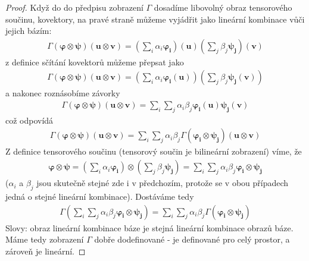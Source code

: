 \documentclass[a5paper,12pt]{amsbook}
\theoremstyle{definition}
\newcommand{\myvec}[1]{\mathbf{#1}}
\begin{document}
\begin{proof}
Když do do předpisu zobrazení $\Gamma$ dosadíme libovolný obraz tensorového součinu, kovektory,
na pravé straně můžeme vyjádřit jako lineární kombinace vůči jejich bázím:
\begin{equation*}
\begin{split}
\Gamma(\myvec{\varphi}\otimes\myvec{\psi})(\myvec{u}\otimes\myvec{v}) =
  \left(\sum_{i}\alpha_i\myvec{\varphi_i}\right)(\myvec{u})
  \left(\sum_{j}\beta_j\myvec{\psi_j}\right)(\myvec{v})
\end{split}
\end{equation*}
z definice sčítání kovektorů můžeme přepsat jako
\begin{equation*}
\begin{split}
\Gamma(\myvec{\varphi}\otimes\myvec{\psi})(\myvec{u}\otimes\myvec{v}) =
  \left(\sum_{i}\alpha_i\myvec{\varphi_i}(\myvec{u})\right)
  \left(\sum_{j}\beta_j\myvec{\psi_j}(\myvec{v})\right)
\end{split}
\end{equation*}
a nakonec roznásobíme závorky
\begin{equation*}
\begin{split}
\Gamma(\myvec{\varphi}\otimes\myvec{\psi})(\myvec{u}\otimes\myvec{v}) =
  \sum_{i}\sum_{j}\alpha_i\beta_j\myvec{\varphi_i}(\myvec{u})\myvec{\psi_j}(\myvec{v})
\end{split}
\end{equation*}
což odpovídá
\begin{equation*}
\begin{split}
\Gamma(\myvec{\varphi}\otimes\myvec{\psi})(\myvec{u}\otimes\myvec{v}) =
  \sum_{i}\sum_{j}\alpha_i\beta_j\Gamma(\myvec{\varphi_i}\otimes\myvec{\psi_j})(\myvec{u}\otimes\myvec{v})
\end{split}
\end{equation*}
Z definice tensorového součinu (tensorový součin je bilineární zobrazení) víme, že
\begin{equation*}
\begin{split}
\myvec{\varphi}\otimes\myvec{\psi} 
  = \left(\sum_i\alpha_i\myvec{\varphi_i}\right)\otimes\left(\sum_j\beta_j\myvec{\psi_j}\right)
  = \sum_i\sum_j\alpha_i\beta_j\myvec{\varphi_i}\otimes\myvec{\psi_j}
\end{split}
\end{equation*}
($\alpha_i$ a $\beta_j$ jsou skutečně stejné zde i v předchozím, protože se v obou případech jedná
o stejné lineární kombinace). Dostáváme tedy
\begin{equation*}
\begin{split}
\Gamma(\sum_i\sum_j\alpha_i\beta_j\myvec{\varphi_i}\otimes\myvec{\psi_j})
  = \sum_{i}\sum_{j}\alpha_i\beta_j\Gamma(\myvec{\varphi_i}\otimes\myvec{\psi_j})
\end{split}
\end{equation*}
Slovy: obraz lineární kombinace báze je stejná lineární kombinace obrazů báze. Máme tedy
zobrazení $\Gamma$ dobře dodefinované - je definované pro celý prostor, a zároveň je lineární.


\end{proof}
\end{document}
